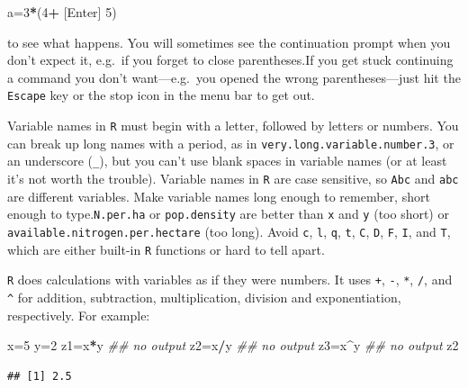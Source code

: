 \documentclass[11pt,]{article}
\newenvironment{Shaded}{\begin{snugshade}}{\end{snugshade}}
\newcommand{\CommentTok}[1]{\textcolor[rgb]{0.56,0.35,0.01}{\textit{#1}}}
\newcommand{\DecValTok}[1]{\textcolor[rgb]{0.00,0.00,0.81}{#1}}
\newcommand{\NormalTok}[1]{#1}
\newcommand{\OperatorTok}[1]{\textcolor[rgb]{0.81,0.36,0.00}{\textbf{#1}}}
\newcommand{\StringTok}[1]{\textcolor[rgb]{0.31,0.60,0.02}{#1}}
\begin{document}
\begin{Shaded}
\begin{Highlighting}[]
\NormalTok{a=}\DecValTok{3}\OperatorTok{*}\NormalTok{(}\DecValTok{4}\OperatorTok{+}\StringTok{ }\NormalTok{[Enter]}
\DecValTok{5}\NormalTok{)}
\end{Highlighting}
\end{Shaded}

to see what happens. You will sometimes see the continuation prompt when you don't expect it, e.g.~if you forget to close parentheses.If you get stuck continuing a command you don't want---e.g.~you opened the wrong parentheses---just hit the \texttt{Escape} key or the stop icon in the menu bar to get out.

Variable names in \texttt{R} must begin with a letter, followed by letters or numbers. You can break up long names with a period, as in \texttt{very.long.variable.number.3}, or an underscore (\texttt{\_}), but you can't use blank spaces in variable names (or at least it's not worth the trouble).
Variable names in \texttt{R} are case sensitive, so \texttt{Abc} and \texttt{abc}
are different variables. Make variable names long enough to remember, short
enough to type.\texttt{N.per.ha} or \texttt{pop.density} are better than \texttt{x}
and \texttt{y} (too short) or \texttt{available.nitrogen.per.hectare} (too long).
Avoid \texttt{c}, \texttt{l}, \texttt{q}, \texttt{t}, \texttt{C}, \texttt{D}, \texttt{F}, \texttt{I}, and \texttt{T}, which are either built-in \texttt{R} functions or hard to tell apart.

\texttt{R} does calculations with variables as if they were numbers. It uses
\texttt{+}, \texttt{-}, \texttt{*}, \texttt{/}, and \texttt{\^{}} for addition, subtraction, multiplication, division and exponentiation, respectively. For example:

\begin{Shaded}
\begin{Highlighting}[]
\NormalTok{x=}\DecValTok{5}
\NormalTok{y=}\DecValTok{2}
\NormalTok{z1=x}\OperatorTok{*}\NormalTok{y }\CommentTok{## no output}
\NormalTok{z2=x}\OperatorTok{/}\NormalTok{y }\CommentTok{## no output}
\NormalTok{z3=x}\OperatorTok{^}\NormalTok{y }\CommentTok{## no output}
\NormalTok{z2}
\end{Highlighting}
\end{Shaded}

\begin{verbatim}
## [1] 2.5
\end{verbatim}
\end{document}
